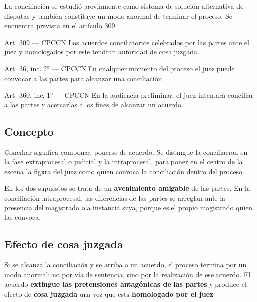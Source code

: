 \documentclass[12pt,oneside]{book}
\begin{document}
La conciliación se estudió previamente como sistema de solución alternativa de disputas y también constituye un modo anormal de terminar el proceso. Se encuentra prevista en el artículo 309.

\begin{articulo}{Art. 309 --- CPCCN}
Los acuerdos conciliatorios celebrados por las partes ante el juez y homologados por éste tendrán autoridad de cosa juzgada.
\end{articulo}

\begin{articulo}{Art. 36, inc. 2° --- CPCCN}
En cualquier momento del proceso el juez puede convocar a las partes para alcanzar una conciliación.
\end{articulo}

\begin{articulo}{Art. 360, inc. 1° --- CPCCN}
En la audiencia preliminar, el juez intentará conciliar a las partes y acercarlas a los fines de alcanzar un acuerdo.
\end{articulo}

\subsection{Concepto}

Conciliar significa componer, ponerse de acuerdo. %
Se distingue la conciliación en la fase extraprocesal o judicial y la intraprocesal, para poner en el centro de la escena la figura del juez como quien convoca la conciliación dentro del proceso.

En los dos supuestos se trata de un \textbf{avenimiento amigable} de las partes. En la conciliación intraprocesal, las diferencias de las partes se arreglan ante la presencia del magistrado o a instancia suya, porque es el propio magistrado quien las convoca.

\subsection{Efecto de cosa juzgada}

Si se alcanza la conciliación y se arriba a un acuerdo, el proceso termina por un modo anormal: no por vía de sentencia, sino por la realización de ese acuerdo. El acuerdo \textbf{extingue las pretensiones antagónicas de las partes} y produce el efecto de \textbf{cosa juzgada} una vez que está \textbf{homologado por el juez}.
\end{document}
